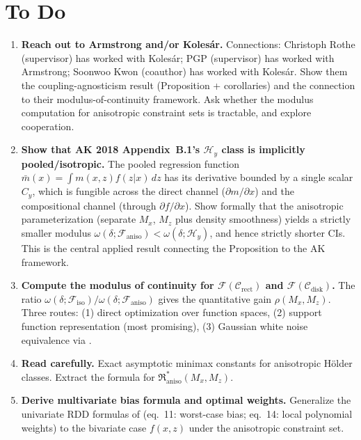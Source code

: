 \section*{To Do}\label{sec:todo}

\begin{enumerate}

	\item \textbf{Reach out to Armstrong and/or Kolesár.}
	Connections: Christoph Rothe (supervisor) has worked with Kolesár; PGP (supervisor) has worked with Armstrong; Soonwoo Kwon (coauthor) has worked with Kolesár.
	Show them the coupling-agnosticism result (Proposition + corollaries) and the connection to their modulus-of-continuity framework.
	Ask whether the modulus computation for anisotropic constraint sets is tractable, and explore cooperation.

	\item \textbf{Show that AK 2018 Appendix~B.1's $\mathcal{H}_y$ class is implicitly pooled/isotropic.}
	The pooled regression function $\bar{m}(x) = \int m(x,z) f(z|x)\, dz$ has its derivative bounded by a single scalar $C_y$, which is fungible across the direct channel ($\partial m / \partial x$) and the compositional channel (through $\partial f / \partial x$).
	Show formally that the anisotropic parameterization (separate $M_x$, $M_z$ plus density smoothness) yields a strictly smaller modulus $\omega(\delta; \mathcal{F}_{\mathrm{aniso}}) < \omega(\delta; \mathcal{H}_y)$, and hence strictly shorter CIs.
	This is the central applied result connecting the Proposition to the AK framework.

	\item \textbf{Compute the modulus of continuity for $\mathcal{F}(\mathcal{C}_{\mathrm{rect}})$ and $\mathcal{F}(\mathcal{C}_{\mathrm{disk}})$.}
	The ratio $\omega(\delta; \mathcal{F}_{\mathrm{iso}}) / \omega(\delta; \mathcal{F}_{\mathrm{aniso}})$ gives the quantitative gain $\rho(M_x, M_z)$.
	Three routes: (1) direct optimization over function spaces, (2) support function representation (most promising), (3) Gaussian white noise equivalence via \textcite{bertin_exact_2004}.

	\item \textbf{Read \textcite{bertin_exact_2004} carefully.}
	Exact asymptotic minimax constants for anisotropic Hölder classes.
	Extract the formula for $\mathfrak{R}^*_{\mathrm{aniso}}(M_x, M_z)$.

	\item \textbf{Derive multivariate bias formula and optimal weights.}
	Generalize the univariate RDD formulas of \textcite{armstrong_optimal_2018} (eq.~11: worst-case bias; eq.~14: local polynomial weights) to the bivariate case $f(x, z)$ under the anisotropic constraint set.


\end{enumerate}
